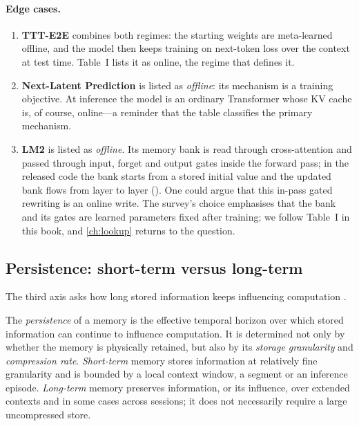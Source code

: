 \paragraph{Edge cases.}
\begin{enumerate}
  \item \textbf{TTT-E2E} \citep{tandon2025ttte2e} combines both regimes: the starting weights are
        meta-learned offline, and the model then keeps training on next-token loss over the
        context at test time. Table~I lists it as online, the regime that defines it.
  \item \textbf{Next-Latent Prediction} is listed as \emph{offline}: its mechanism is a training
        objective. At inference the model is an ordinary Transformer whose KV cache is, of course,
        online---a reminder that the table classifies the primary mechanism.
  \item \textbf{LM2} \citep{kang2025lm2} is listed as \emph{offline}. Its memory bank is read
        through cross-attention and passed through input, forget and output gates inside the
        forward pass; in the released code the bank starts from a stored initial value and the
        updated bank flows from layer to layer ().
        One could argue that this in-pass gated rewriting is an online write. The survey's choice
        emphasises that the bank and its gates are learned parameters fixed after training; we
        follow Table~I in this book, and \cref{ch:lookup} returns to the question.
\end{enumerate}

\subsection{Persistence: short-term versus long-term}\label{sec:c02-persistence}

The third axis asks how long stored information keeps influencing computation
\citep[\S II-C]{zhoubian2026memory}.

\begin{definition}[Persistence]\label{def:c02-persistence}
The \emph{persistence} of a memory is the effective temporal horizon over which stored information
can continue to influence computation. It is determined not only by whether the memory is
physically retained, but also by its \emph{storage granularity} and \emph{compression rate}.
\emph{Short-term} memory stores information at relatively fine granularity and is bounded by a
local context window, a segment or an inference episode. \emph{Long-term} memory preserves
information, or its influence, over extended contexts and in some cases across sessions; it does
not necessarily require a large uncompressed store.
\end{definition}

